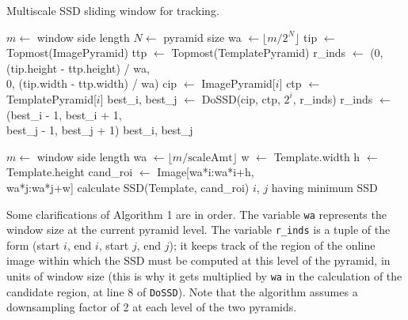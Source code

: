 \documentclass[10pt,twocolumn,letterpaper]{article}
\begin{document}
\begin{algorithm}
 \caption{Multiscale SSD sliding window for tracking.}
 \begin{algorithmic}[1]
  \State $m \leftarrow$ window side length
  \State $N \leftarrow$ pyramid size
  \State wa $\leftarrow \lfloor m / 2^{N} \rfloor$
  \State tip $\leftarrow$ Topmost(ImagePyramid)
  \State ttp $\leftarrow$ Topmost(TemplatePyramid)
  \State r\_inds $\leftarrow$ (0, (tip.height - ttp.height) / wa,\\\hspace{57pt}0, (tip.width - ttp.width) / wa)
     \State cip $\leftarrow$ ImagePyramid[$i$]
     \State ctp $\leftarrow$ TemplatePyramid[$i$]
     \State best\_i, best\_j $\leftarrow$ DoSSD(cip, ctp, $2^{i}$, r\_inds)
     \State r\_inds $\leftarrow$ (best\_i - 1, best\_i + 1,\\\hspace{73pt}best\_j - 1, best\_j + 1)
  \EndFor
  \State \Return best\_i, best\_j
  \EndProcedure
 \end{algorithmic}
  \begin{algorithmic}[1]
  \State $m \leftarrow$ window side length
  \State wa $\leftarrow \lfloor m / \text{scaleAmt} \rfloor$
  \State w $\leftarrow$ Template.width
  \State h $\leftarrow$ Template.height
    \State cand\_roi $\leftarrow$ Image[wa*i:wa*i+h,\\\hspace{122pt}wa*j:wa*j+w]
    \State calculate SSD(Template, cand\_roi)
    \EndFor
  \EndFor
  \State \Return $i$, $j$ having minimum SSD
  \EndProcedure
 \end{algorithmic}
\end{algorithm}

Some clarifications of Algorithm 1 are in order. The variable \texttt{wa}
represents the window size at the current pyramid level. The variable \texttt{r\_inds}
is a tuple of the form (start $i$, end $i$, start $j$, end $j$); it keeps
track of the region of the online image within which the SSD must be computed
at this level of the pyramid, in units of window size (this is why it gets
multiplied by \texttt{wa} in the calculation of the candidate region, at line 8 of
\texttt{DoSSD}). Note that the algorithm assumes a downsampling factor of 2 at each level
of the two pyramids.
\end{document}
